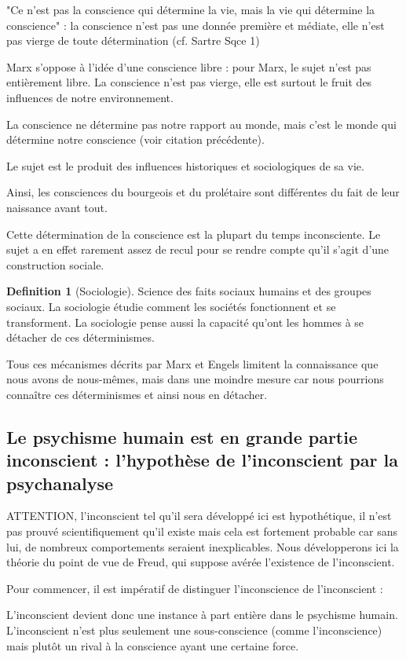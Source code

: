 \documentclass[french]{book}
\theoremstyle{definition}
\newtheorem*{dfn}{Definition}
\begin{document}
"Ce n'est pas la conscience qui détermine la vie, mais la vie qui détermine la conscience" : la conscience n'est pas une donnée première et médiate, elle n'est pas vierge de toute détermination (cf. Sartre Sqce 1)

Marx s'oppose à l'idée d'une conscience libre : pour Marx, le sujet n'est pas entièrement libre.
La conscience n'est pas vierge, elle est surtout le fruit des influences de notre environnement.

La conscience ne détermine pas notre rapport au monde, mais c'est le monde qui détermine notre conscience (voir citation précédente).

Le sujet est le produit des influences historiques et sociologiques de sa vie.

Ainsi, les consciences du bourgeois et du prolétaire sont différentes du fait de leur naissance avant tout.

Cette détermination de la conscience est la plupart du temps inconsciente. Le sujet a en effet rarement assez de recul pour se rendre compte qu'il s'agit d'une construction sociale.

\begin{dfn}[Sociologie] 
Science des faits sociaux humains et des groupes sociaux. La sociologie étudie comment les sociétés fonctionnent et se transforment. La sociologie pense aussi la capacité qu'ont les hommes à se détacher de ces déterminismes.
\end{dfn}


Tous ces mécanismes décrits par Marx et Engels limitent la connaissance que nous avons de nous-mêmes, mais dans une moindre mesure car nous pourrions connaître ces déterminismes et ainsi nous en détacher.


\subsection{Le psychisme humain est en grande partie inconscient : l'hypothèse de l'inconscient par la psychanalyse}

ATTENTION, l'inconscient tel qu'il sera développé ici est hypothétique, il n'est pas prouvé scientifiquement qu'il existe mais cela est fortement probable car sans lui, de nombreux comportements seraient inexplicables. Nous développerons ici la théorie du point de vue de Freud, qui suppose avérée l'existence de l'inconscient.

Pour commencer, il est impératif de distinguer l'inconscience de l'inconscient :

L'inconscient devient donc une instance à part entière dans le psychisme humain.
L'inconscient n'est plus seulement une sous-conscience (comme l'inconscience) mais plutôt un rival à la conscience ayant une certaine force.
\end{document}
